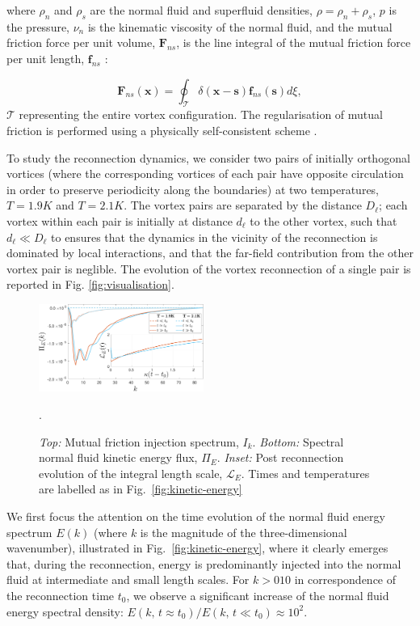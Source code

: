 \documentclass[%
 reprint,
 amsmath,amssymb,
 aps,
 prl,
]{revtex4-2}
\def \s{\mathbf{s}}
\def \x{\mathbf{x}}
\begin{document}
{\noindent
where 
$\rho_n$ and $\rho_s$ are the normal fluid and superfluid densities,
$\rho=\rho_n + \rho_s$,  $p$ is the pressure,  $\nu_n$ is the kinematic 
viscosity of the normal fluid, and the mutual friction force per unit
volume, $\mathbf{F}_{ns}$, is the line integral of the mutual friction 
force per unit length, $\mathbf{f}_{ns}$ \cite{suppMat}:

\begin{equation}
\mathbf{F}_{ns}(\x) = 
\oint_{\mathcal{T}}\delta(\x-\s)\mathbf{f}_{ns}(\s)d\xi,     
\end{equation}
$\mathcal{T}$ representing the entire vortex configuration. 
The regularisation of mutual friction is performed using a physically self-consistent scheme \cite{galantucciNewSelfconsistentApproach2020b, gualtieri2015exact, gualtieri2017turbulence}.

To study the reconnection dynamics, we consider
two pairs of initially orthogonal vortices 
(where the corresponding vortices of each pair have opposite circulation 
in order to preserve periodicity along the boundaries)
at two temperatures, $T=1.9K$ and $T=2.1K$. The vortex pairs are 
separated by the distance $D_{\ell}$; each vortex within each pair is 
initially at distance $d_{\ell}$ to the other vortex, 
such that $d_{\ell}\ll D_{\ell}$ to ensures that the dynamics 
in the vicinity of the reconnection is dominated by local interactions, 
and that the far-field contribution from the other vortex pair is
neglible. The evolution of the vortex reconnection of a single pair is reported in Fig. \ref{fig:visualisation}. 
\begin{figure}[t]
    \centering
    \includegraphics*[width=0.48\textwidth]{flux-spec.pdf}
\caption{\emph{Top:} Mutual friction injection spectrum, $I_k$. 
\emph{Bottom:} Spectral normal fluid kinetic energy flux, $\Pi_E$. 
\emph{Inset:} Post reconnection evolution of the integral length scale, $\mathcal{L}_E$.
Times and temperatures are labelled as in Fig.~\ref{fig:kinetic-energy}}.
\label{fig:energy-flux}
\end{figure}

We first focus the attention on the time evolution of the normal fluid
energy spectrum $E(k)$ (where $k$ is the magnitude of the three-dimensional
wavenumber), illustrated 
in Fig.~\ref{fig:kinetic-energy}, where it clearly emerges that,
during the reconnection, energy is predominantly injected into the 
normal fluid at intermediate and small length scales. 
For $k>010$ in correspondence of the reconnection time $t_0$,
we observe a significant increase of the normal fluid energy spectral density:
$E(k,\, t\approx t_0)/E(k,\, t\ll t_0) \approx 10^2$. 

}
\end{document}
